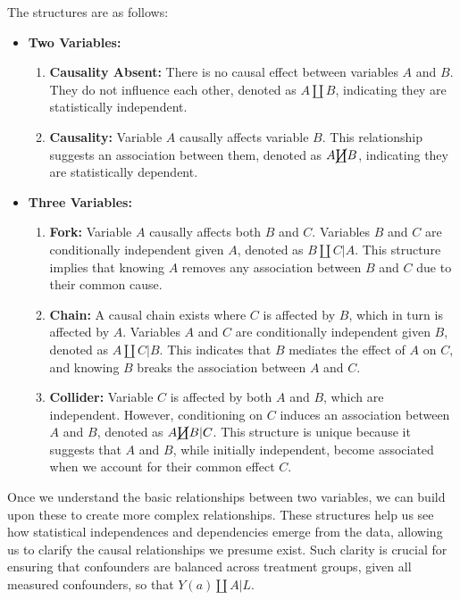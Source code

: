 \documentclass[
  singlecolumn]{article}
\providecommand{\tightlist}{%
  \setlength{\itemsep}{0pt}\setlength{\parskip}{0pt}}\usepackage{longtable,booktabs,array}
\begin{document}
The structures are as follows:

\begin{itemize}
\tightlist
\item
  \textbf{Two Variables:}

  \begin{enumerate}
  \def\labelenumi{\arabic{enumi}.}
  \tightlist
  \item
    \textbf{Causality Absent:} There is no causal effect between
    variables \(A\) and \(B\). They do not influence each other, denoted
    as \(A \coprod B\), indicating they are statistically independent.
  \item
    \textbf{Causality:} Variable \(A\) causally affects variable \(B\).
    This relationship suggests an association between them, denoted as
    \(A \cancel\coprod B\), indicating they are statistically dependent.
  \end{enumerate}
\item
  \textbf{Three Variables:}

  \begin{enumerate}
  \def\labelenumi{\arabic{enumi}.}
  \setcounter{enumi}{2}
  \tightlist
  \item
    \textbf{Fork:} Variable \(A\) causally affects both \(B\) and \(C\).
    Variables \(B\) and \(C\) are conditionally independent given \(A\),
    denoted as \(B \coprod C | A\). This structure implies that knowing
    \(A\) removes any association between \(B\) and \(C\) due to their
    common cause.
  \item
    \textbf{Chain:} A causal chain exists where \(C\) is affected by
    \(B\), which in turn is affected by \(A\). Variables \(A\) and \(C\)
    are conditionally independent given \(B\), denoted as
    \(A \coprod C | B\). This indicates that \(B\) mediates the effect
    of \(A\) on \(C\), and knowing \(B\) breaks the association between
    \(A\) and \(C\).
  \item
    \textbf{Collider:} Variable \(C\) is affected by both \(A\) and
    \(B\), which are independent. However, conditioning on \(C\) induces
    an association between \(A\) and \(B\), denoted as
    \(A \cancel\coprod B | C\). This structure is unique because it
    suggests that \(A\) and \(B\), while initially independent, become
    associated when we account for their common effect \(C\).
  \end{enumerate}
\end{itemize}

Once we understand the basic relationships between two variables, we can
build upon these to create more complex relationships. These structures
help us see how statistical independences and dependencies emerge from
the data, allowing us to clarify the causal relationships we presume
exist. Such clarity is crucial for ensuring that confounders are
balanced across treatment groups, given all measured confounders, so
that \(Y(a) \coprod A | L\).
\end{document}
